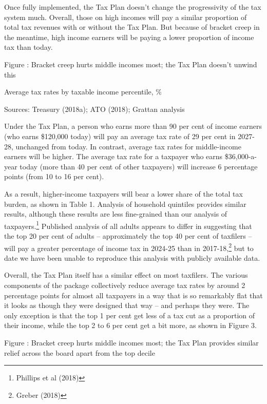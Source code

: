 \documentclass[submission]{grattan}\usepackage[]{graphicx}\usepackage[]{color}
\begin{document}
Once fully implemented, the Tax Plan doesn't change the progressivity of the tax system much. Overall, those on high incomes will pay a similar proportion of total tax revenues with or without the Tax Plan. But because of bracket creep in the meantime, high income earners will be paying a lower proportion of income tax than today.

Figure : Bracket creep hurts middle incomes most; the Tax Plan doesn't unwind this

Average tax rates by taxable income percentile, \%



Sources: Treasury (2018a); ATO (2018); Grattan analysis

Under the Tax Plan, a person who earns more than 90 per cent of income earners (who earns \$120,000 today) will pay an average tax rate of 29 per cent in 2027-28, unchanged from today. In contrast, average tax rates for middle-income earners will be higher. The average tax rate for a taxpayer who earns \$36,000-a-year today (more than 40 per cent of other taxpayers) will increase 6 percentage points (from 10 to 16 per cent).

As a result, higher-income taxpayers will bear a lower share of the total tax burden, as shown in Table 1. Analysis of household quintiles provides similar results, although these results are less fine-grained than our analysis of taxpayers.\footnote{Phillips et al (2018)} Published analysis of all adults appears to differ in suggesting that the top 20 per cent of adults -- approximately the top 40 per cent of taxfilers -- will pay a greater percentage of income tax in 2024-25 than in 2017-18,\footnote{Greber (2018)} but to date we have been unable to reproduce this analysis with publicly available data.

Overall, the Tax Plan itself has a similar effect on most taxfilers. The various components of the package collectively reduce average tax rates by around 2 percentage points for almost all taxpayers in a way that is so remarkably flat that it looks as though they were designed that way -- and perhaps they were. The only exception is that the top 1 per cent get less of a tax cut as a proportion of their income, while the top 2 to 6 per cent get a bit more, as shown in Figure 3.

Figure : Bracket creep hurts middle incomes most; the Tax Plan provides similar relief across the board apart from the top decile
\end{document}
